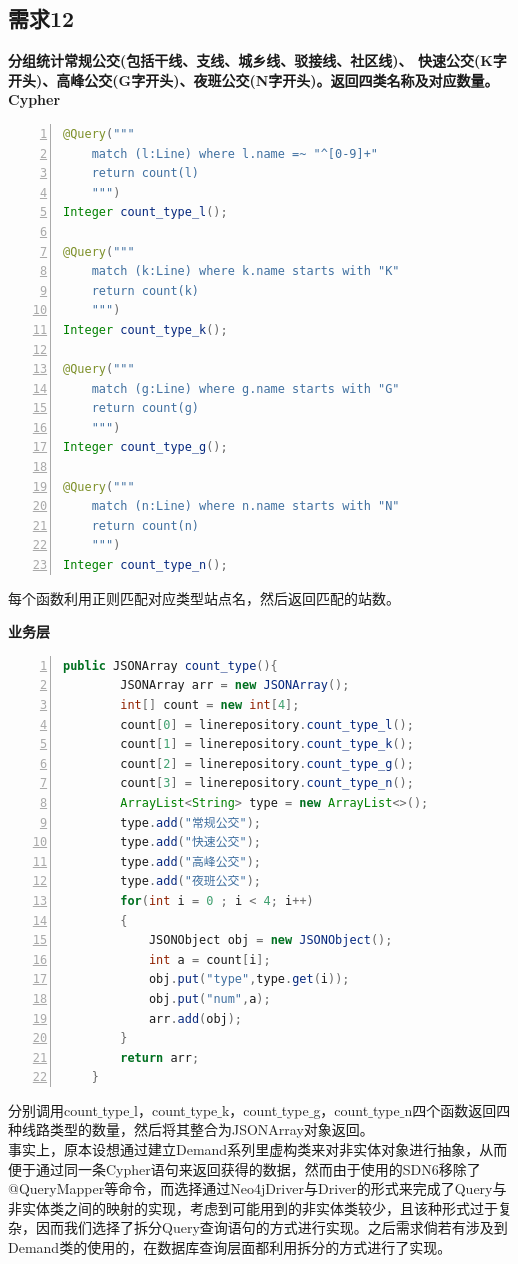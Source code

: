\documentclass[11pt,a4paper]{article}
\begin{document}
\subsection{需求12}
\textbf{分组统计常规公交(包括干线、支线、城乡线、驳接线、社区线)、 快速公交(K字开头)、高峰公交(G字开头)、夜班公交(N字开头)。返回四类名称及对应数量。} \\
\textbf{Cypher} \\
\begin{lstlisting}[numbers = left, 
showstringspaces=false,
showspaces = false,
breaklines = true, 
language=Java]
@Query("""
	match (l:Line) where l.name =~ "^[0-9]+"
	return count(l)
	""")
Integer count_type_l();

@Query("""
	match (k:Line) where k.name starts with "K"
	return count(k)
	""")
Integer count_type_k();

@Query("""
	match (g:Line) where g.name starts with "G"
	return count(g)
	""")
Integer count_type_g();

@Query("""
	match (n:Line) where n.name starts with "N"
	return count(n)
	""")
Integer count_type_n();
\end{lstlisting} 
每个函数利用正则匹配对应类型站点名，然后返回匹配的站数。

\textbf{业务层} \\
\begin{lstlisting}[numbers = left, 
showstringspaces=false,
showspaces = false,
breaklines = true, 
language=Java]
    public JSONArray count_type(){
        JSONArray arr = new JSONArray();
        int[] count = new int[4];
        count[0] = linerepository.count_type_l();
        count[1] = linerepository.count_type_k();
        count[2] = linerepository.count_type_g();
        count[3] = linerepository.count_type_n();
        ArrayList<String> type = new ArrayList<>();
        type.add("常规公交");
        type.add("快速公交");
        type.add("高峰公交");
        type.add("夜班公交");
        for(int i = 0 ; i < 4; i++)
        {
            JSONObject obj = new JSONObject();
            int a = count[i];
            obj.put("type",type.get(i));
            obj.put("num",a);
            arr.add(obj);
        }
        return arr;
    }
\end{lstlisting} 
分别调用count$\_$type$\_$l，count$\_$type$\_$k，count$\_$type$\_$g，count$\_$type$\_$n四个函数返回四种线路类型的数量，然后将其整合为JSONArray对象返回。 \\
事实上，原本设想通过建立Demand系列里虚构类来对非实体对象进行抽象，从而便于通过同一条Cypher语句来返回获得的数据，然而由于使用的SDN6移除了@QueryMapper等命令，而选择通过Neo4jDriver与Driver的形式来完成了Query与非实体类之间的映射的实现，考虑到可能用到的非实体类较少，且该种形式过于复杂，因而我们选择了拆分Query查询语句的方式进行实现。之后需求倘若有涉及到Demand类的使用的，在数据库查询层面都利用拆分的方式进行了实现。
\end{document}
